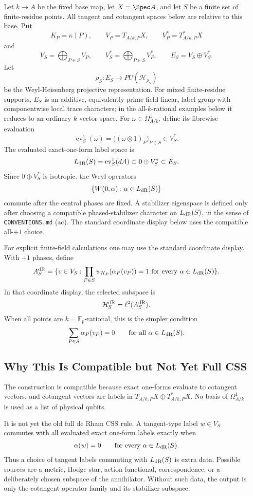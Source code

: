 Let \(k\to A\) be the fixed base map, let \(X=\Spec A\), and let \(S\) be a
finite set of finite-residue points.  All tangent and cotangent spaces below
are relative to this base.  Put
\[
  K_P=\kappa(P),\qquad V_P=T_{A/k,P}X,\qquad V_P^*=T_{A/k,P}^*X
\]
and
\[
  V_S=\bigoplus_{P\in S}V_P,\qquad
  V_S^*=\bigoplus_{P\in S}V_P^*,\qquad
  E_S=V_S\oplus V_S^*.
\]
Let
\[
  \rho_S:E_S\to PU(\mathcal H_{\rho_S})
\]
be the Weyl-Heisenberg projective representation.  For mixed finite-residue
supports, \(E_S\) is an additive, equivalently prime-field-linear, label group
with componentwise local trace characters; in the all-\(k\)-rational examples
below it reduces to an ordinary \(k\)-vector space.  For
\(\omega\in\Omega^1_{A/k}\), define its fibrewise evaluation
\[
  \operatorname{ev}^1_S(\omega)=
  \bigl((\omega\otimes1)_P\bigr)_{P\in S}\in V_S^*.
\]
The evaluated exact-one-form label space is
\[
  L_{\rm dR}(S)=\operatorname{ev}^1_S(dA)\subset 0\oplus V_S^*\subset E_S.
\]
Since \(0\oplus V_S^*\) is isotropic, the Weyl operators
\[
  \{W(0,\alpha):\alpha\in L_{\rm dR}(S)\}
\]
commute after the central phases are fixed.  A stabilizer eigenspace is defined
only after choosing a compatible phased-stabilizer character on
\(L_{\rm dR}(S)\), in the sense of \texttt{CONVENTIONS.md} (ac).  The standard
coordinate display below uses the compatible all-\(+1\) choice.

For explicit finite-field calculations one may use the standard coordinate
display.  With \(+1\) phases, define
\[
  A_S^{\rm dR}=
  \{v\in V_S:
    \prod_{P\in S}\psi_{K_P}(\alpha_P(v_P))=1
    \text{ for every }\alpha\in L_{\rm dR}(S)\}.
\]
In that coordinate display, the selected subspace is
\[
  \mathcal H_S^{\rm dR}=\ell^2(A_S^{\rm dR}).
\]
When all points are \(k=\mathbb F_p\)-rational, this is the simpler condition
\[
  \sum_{P\in S}\alpha_P(v_P)=0
  \qquad\text{for all }\alpha\in L_{\rm dR}(S).
\]

\subsection{Why This Is Compatible but Not Yet Full CSS}

The construction is compatible because exact one-forms evaluate to cotangent
vectors, and cotangent vectors are labels in
\(T_{A/k,P}X\oplus T^*_{A/k,P}X\).  No basis of \(\Omega^1_{A/k}\) is used as a
list of physical qubits.

It is not yet the old full de Rham CSS rule.  A tangent-type label
\(w\in V_S\) commutes with all evaluated exact one-form labels exactly when
\[
  \alpha(w)=0\qquad\text{for every }\alpha\in L_{\rm dR}(S).
\]
Thus a choice of tangent labels commuting with \(L_{\rm dR}(S)\) is extra data.
Possible sources are a metric, Hodge star, action functional, correspondence,
or a deliberately chosen subspace of the annihilator.  Without such data, the
output is only the cotangent operator family and its stabilizer subspace.

